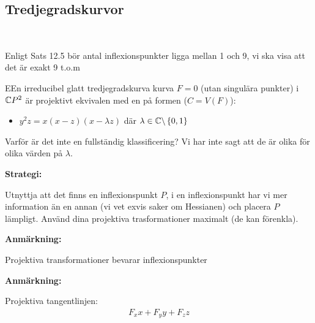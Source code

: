 \subsection{Tredjegradskurvor}\hfill\\\par
\noindent Enligt Sats 12.5 bör antal inflexionspunkter ligga mellan 1 och 9, vi ska visa att det är exakt 9 t.o.m
\par\bigskip
\begin{theo}
  EEn irreducibel glatt tredjegradskurva kurva $F =0$ (utan singulära punkter) i $\mathbb{C} P^2$ är projektivt ekvivalen med en på formen ($C = V(F)$):
  \begin{itemize}
    \item $y^2z = x(x-z)(x-\lambda z)$ där $\lambda\in\mathbb{C}\backslash\left\{0,1\right\}$
  \end{itemize}
\end{theo}
\par\bigskip
\noindent Varför är det inte en fullständig klassificering? Vi har inte sagt att de är olika för olika värden på $\lambda$.
\par\bigskip
\noindent\textbf{Strategi:}\par
\noindent Utnyttja att det finns en inflexionspunkt $P$, i en inflexionspunkt har vi mer information än en annan (vi vet exvis saker om Hessianen) och placera $P$ lämpligt. Använd dina projektiva trasformationer maximalt (de kan förenkla). 
\par\bigskip
\noindent\textbf{Anmärkning:}\par
\noindent Projektiva transformationer bevarar inflexionspunkter
\par\bigskip
\noindent\textbf{Anmärkning:}\par
\noindent Projektiva tangentlinjen:
\begin{equation*}
  \begin{gathered}
    F_xx+F_yy+F_zz
  \end{gathered}
\end{equation*}
